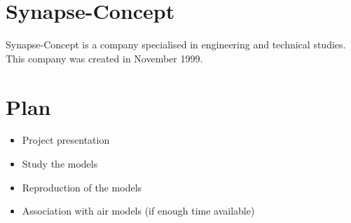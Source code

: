 \documentclass[a4paper,10pt]{article}
\begin{document}
\section*{Synapse-Concept}

Synapse-Concept is a company specialised in engineering and technical studies. This company was created in November 1999.

\section*{Plan}

\begin{itemize}
    \item Project presentation
    \item Study the models
    \item Reproduction of the models
    \item Association with air models (if enough time available)
\end{itemize}
\pagebreak
\end{document}
